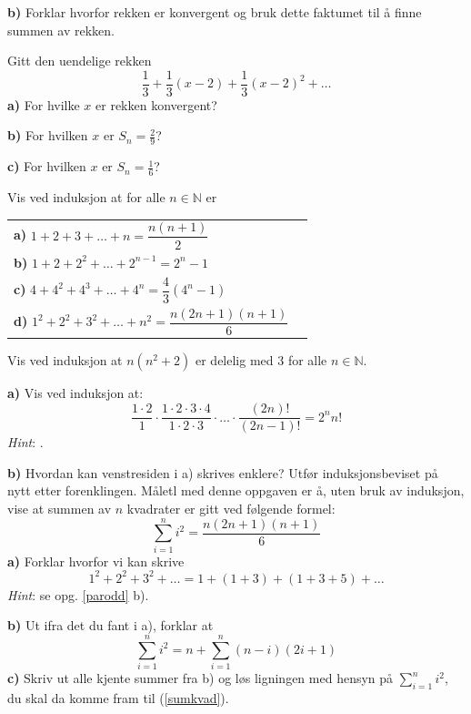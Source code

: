 \textbf{b)} Forklar hvorfor rekken er konvergent og bruk dette faktumet til å finne summen av rekken. 

Gitt den uendelige rekken
\[\frac{1}{3} +\frac{1}{3}(x-2)+ \frac{1}{3}(x-2)^2+\ldots\]
\textbf{a)} For hvilke $ x $ er rekken konvergent? \os

\textbf{b)} For hvilken $ x $ er $ S_n = \frac{2}{9} $?\os

\textbf{c)} For hvilken $ x $ er $ S_n= \frac{1}{6}$? \os

\nes
{}
Vis ved induksjon at for alle $ n\in \mathbb{N} $ er\\[10pt]
\begin{tabular}{@{}l l}	
	\textbf{a)} $ 1+2+3+\ldots+n = \dfrac{n(n+1)}{2} $ \\[10pt]
	\textbf{b)} $ 1+2 +2^2 +\ldots+ 2^{n-1}= 2^n-1$\\[10pt]
	\textbf{c)} $ 4+4^2+4^3+\ldots+4^n = \dfrac{4}{3}(4^n-1) $ \\[10pt]
	\textbf{d)} $ 1^2 + 2^2+3^2+ \ldots+ n^2 = \dfrac{n(2n+1)(n+1)}{6} $ 
\end{tabular} 

Vis ved induksjon at $ n(n^2+2) $ er delelig med 3 for alle $ n\in\mathbb{N} $.

\textbf{a)}
Vis ved induksjon at:
\[\frac{1\cdot2}{1}\cdot\frac{1\cdot2\cdot3\cdot4}{1\cdot2\cdot3}\cdot
\ldots\cdot\frac{(2n)!}{(2n-1)!}=2^n n! \]
\textsl{Hint}: .\os

\textbf{b)} Hvordan kan venstresiden i a) skrives enklere? Utfør induksjonsbeviset på nytt etter forenklingen.
\newpage
{}
Måletl med denne oppgaven er å, uten bruk av induksjon, vise at summen av $ n $ kvadrater er gitt ved følgende formel:
\[ \sum\limits_{i=1}^n i^2 = \frac{n(2n+1)(n+1)}{6} \tag{I}\label{sumkvad}\]
\textbf{a)} Forklar hvorfor vi kan skrive
\[ 1^2 + 2^2 + 3^2+\ldots = 1 + (1+3) + (1+3+5)+ \ldots  \]
\textsl{Hint}: se opg. \ref{parodd} b).\os

\textbf{b)} Ut ifra det du fant i a), forklar at
\[ \sum\limits_{i=1}^n i^2 = n+\sum\limits_{i=1}^n (n-i)(2i+1)  \]
\textbf{c)} Skriv ut alle kjente summer fra b) og løs ligningen med hensyn på $ \sum\limits_{i=1}^n i^2 $, du skal da komme fram til (\ref{sumkvad}).

